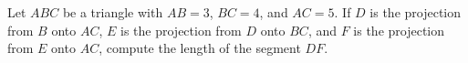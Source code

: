 Let $ABC$ be a triangle with $AB = 3$, $BC = 4$, and $AC =5$. If $D$ is the projection from $B$ onto $AC$, $E$ is the projection from $D$ onto $BC$, and $F$ is the projection from $E$ onto $AC$, compute the length of the segment $DF$.